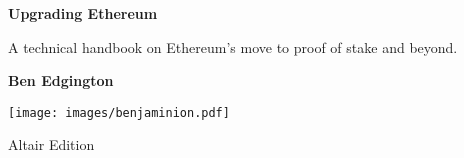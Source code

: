 \begin{titlepage}

   \begin{center}
       \vspace*{1cm}

       \Huge

       \textbf{Upgrading Ethereum}

       \Large

       \vspace{1.0cm}

       A technical handbook on Ethereum's move to proof of stake and beyond.
            
       \vspace{1.0cm}

       \textbf{Ben Edgington}

       \vfill
            
       \texttt{[image: images/benjaminion.pdf]}

       \vfill

       Altair Edition
            
   \end{center}
   \restoregeometry
\end{titlepage}
